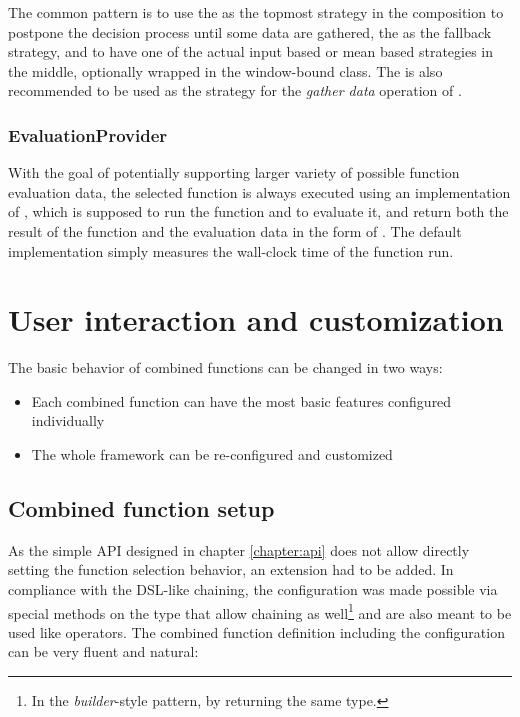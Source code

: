 The common pattern is to use the  as the topmost strategy in the composition to postpone the decision process until some data are gathered, the  as the fallback strategy, and to have one of the actual input based or mean based strategies in the middle, optionally wrapped in the window-bound class. The  is also recommended to be used as the strategy for the \textit{gather data} operation of .

\subsubsection{EvaluationProvider}

With the goal of potentially supporting larger variety of possible function evaluation data, the selected function is always executed using an implementation of , which is supposed to run the function and to evaluate it, and return both the result of the function and the evaluation data in the form of . The default implementation simply measures the wall-clock time of the function run.

\section{User interaction and customization}

The basic behavior of combined functions can be changed in two ways:
\begin{itemize}
	\item Each combined function can have the most basic features configured individually
	\item The whole framework can be re-configured and customized
\end{itemize}

\subsection{Combined function setup}
\label{subsec:function_setup}

As the simple API designed in chapter \ref{chapter:api} does not allow directly setting the function selection behavior, an extension had to be added. In compliance with the DSL-like  chaining, the configuration was made possible via special methods on the  type that allow chaining as well\footnote{In the \textit{builder}-style pattern, by returning the same type.} and are also meant to be used like operators. The combined function definition including the configuration can be very fluent and natural:

